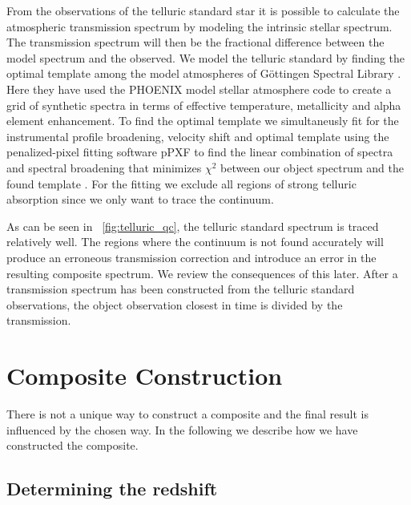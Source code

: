 \documentclass{aa}    %
\newcommand{\figref}[1]{\ref{fig:#1}}
\newcommand{\Fig}[1]{\figurename~\figref{#1}}
\newcommand{\fig}[1]{\Fig{#1}}
\newcommand{\sectlabel}[1]{\label{sect:#1}}
\begin{document}
From the observations of the telluric standard star it is possible to calculate the atmospheric transmission spectrum by modeling the intrinsic stellar spectrum. The transmission spectrum will then be the fractional difference between the model spectrum and the observed.  We model the telluric standard by finding the optimal template among the model atmospheres of G\"ottingen Spectral Library \citep{Husser2013}. Here they have used the PHOENIX model stellar atmosphere code to create a grid of synthetic spectra in terms of effective temperature, metallicity and alpha element enhancement. To find the optimal template we simultaneusly fit for the instrumental profile broadening, velocity shift and optimal template using the penalized-pixel fitting software pPXF \citep{Cappellari2004} to find the linear combination of spectra and spectral broadening that minimizes $\chi ^2$ between our object spectrum and the found template . For the fitting we exclude all regions of strong telluric absorption since we only want to trace the continuum. 

 As can be seen in \fig{telluric_qc}, the telluric standard spectrum is traced relatively well. The regions where the continuum is not found accurately will produce an erroneous transmission correction and introduce an error in the resulting composite spectrum. We review the consequences of this later. After a transmission spectrum has been constructed from the telluric standard observations, the object observation closest in time is divided by the transmission. 



\section{Composite Construction}   \sectlabel{construct}

There is not a unique way to construct a composite and the final result is influenced by the chosen way. In the following we describe how we have constructed the composite.

\subsection{Determining the redshift}  \sectlabel{redshifts}
\end{document}
